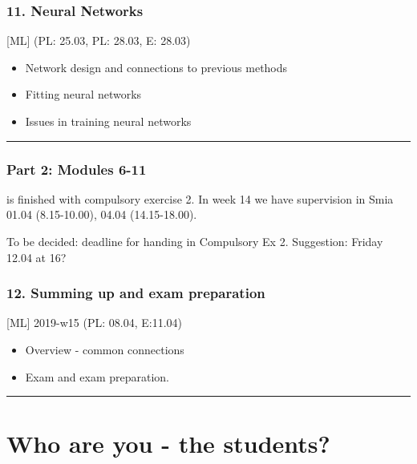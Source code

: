 \documentclass[]{article}
\providecommand{\tightlist}{%
  \setlength{\itemsep}{0pt}\setlength{\parskip}{0pt}}
\begin{document}
\hypertarget{neural-networks}{%
\subsubsection{11. Neural Networks}\label{neural-networks}}

{[}ML{]} (PL: 25.03, PL: 28.03, E: 28.03)

\begin{itemize}
\tightlist
\item
  Network design and connections to previous methods
\item
  Fitting neural networks
\item
  Issues in training neural networks
\end{itemize}

\begin{center}\rule{0.5\linewidth}{\linethickness}\end{center}

\hypertarget{part-2-modules-6-11}{%
\subsubsection{Part 2: Modules 6-11}\label{part-2-modules-6-11}}

is finished with compulsory exercise 2. In week 14 we have supervision
in Smia 01.04 (8.15-10.00), 04.04 (14.15-18.00).

To be decided: deadline for handing in Compulsory Ex 2. Suggestion:
Friday 12.04 at 16?

\hypertarget{summing-up-and-exam-preparation}{%
\subsubsection{12. Summing up and exam
preparation}\label{summing-up-and-exam-preparation}}

{[}ML{]} 2019-w15 (PL: 08.04, E:11.04)

\begin{itemize}
\tightlist
\item
  Overview - common connections
\item
  Exam and exam preparation.
\end{itemize}

\begin{center}\rule{0.5\linewidth}{\linethickness}\end{center}

\hypertarget{who-are-you---the-students}{%
\section{Who are you - the students?}\label{who-are-you---the-students}}
\end{document}
